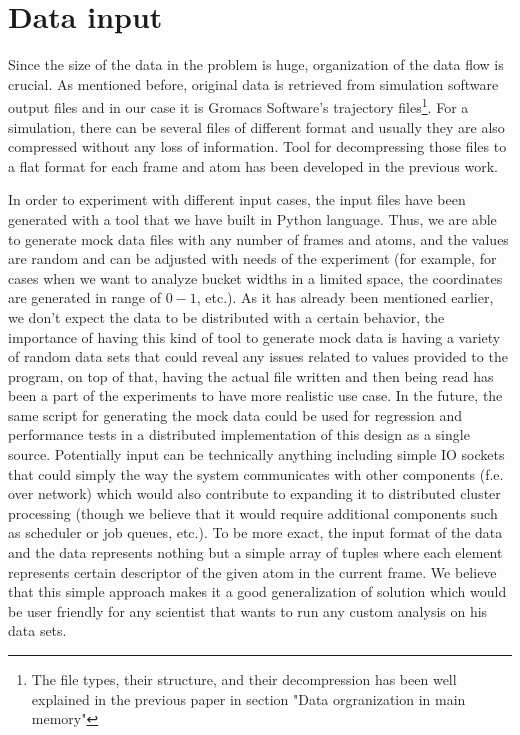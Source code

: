\documentclass[12pt,letterpaper]{report}
\begin{document}
\section{Data input}
\hspace{3em} Since the size of the data in the problem is huge, organization of the data flow is crucial. As mentioned before, original data is retrieved from simulation software output files and in our case it is Gromacs Software's trajectory files\footnote{The file types, their structure, and their decompression has been well explained in the previous paper in section "Data orgranization in main memory"}. For a simulation, there can be several files of different format and usually they are also compressed without any loss of information. Tool for decompressing those files to a flat format for each frame and atom has been developed in the previous work\cite{mainPaper}. 

In order to experiment with different input cases, the input files have been generated with a tool that we have built in Python language. Thus, we are able to generate mock data files with any number of frames and atoms, and the values are random and can be adjusted with needs of the experiment (for example, for cases when we want to analyze bucket widths in a limited space, the coordinates are generated in range of $0 - 1$, etc.). As it has already been mentioned earlier, we don't expect the data to be distributed with a certain behavior, the importance of having this kind of tool to generate mock data is having a variety of random data sets that could reveal any issues related to values provided to the program, on top of that, having the actual file written and then being read has been a part of the experiments to have more realistic use case. In the future, the same script for generating the mock data could be used for regression and performance tests in a distributed implementation of this design as a single source. Potentially input can be technically anything including simple IO sockets that could simply the way the system communicates with other components (f.e. over network) which would also contribute to expanding it to distributed cluster processing (though we believe that it would require additional components such as scheduler or job queues, etc.). To be more exact, the input format of the data and the data represents nothing but a simple array of tuples where each element represents certain descriptor of the given atom in the current frame. We believe that this simple approach makes it a good generalization of solution which would be user friendly for any scientist that wants to run any custom analysis on his data sets.
\end{document}
